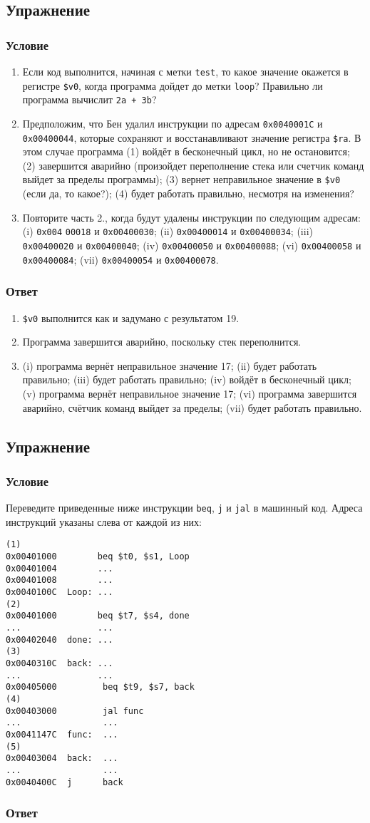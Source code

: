 \documentclass[12pt]{article}
\newenvironment{e}[1][dummy label]{
    \subsection{Упражнение}\label{#1}
    \subsubsection*{Условие}
    }{
    \subsubsection*{Ответ}
}
\begin{document}
\begin{e}
        \newpage

        \begin{enumerate}
            \item Если код выполнится, начиная с метки \texttt{test}, то какое значение окажется в регистре \texttt{\$v0}, когда программа дойдет до метки \texttt{loop}? Правильно ли программа вычислит \texttt{2а + 3b}?
            \item Предположим, что Бен удалил инструкции по адресам \texttt{0x0040001C} и \texttt{0x00400044}, которые сохраняют и восстанавливают значение регистра \texttt{\$ra}. В этом случае программа (1) войдёт в бесконечный цикл, но не остановится; (2) завершится аварийно (произойдет переполнение стека или счетчик команд выйдет за пределы программы); (3) вернет неправильное значение в \texttt{\$v0} (если да, то какое?); (4) будет работать правильно, несмотря на изменения?
            \item Повторите часть 2., когда будут удалены инструкции по следующим адресам: (i) \texttt{0x004} \texttt{00018} и \texttt{0x00400030}; (ii) \texttt{0x00400014} и \texttt{0x00400034}; (iii) \texttt{0x00400020} и \texttt{0x00400040}; (iv) \texttt{0x00400050} и \texttt{0x00400088}; (vi) \texttt{0x00400058} и \texttt{0x00400084}; (vii) \texttt{0x00400054} и \texttt{0x00400078}.
        \end{enumerate}
    \end{e}

    \begin{enumerate}
        \item \texttt{\$v0} выполнится как и задумано с результатом 19.
        \item Программа завершится аварийно, поскольку стек переполнится.
        \item (i) программа вернёт неправильное значение 17; (ii) будет работать правильно; (iii) будет работать правильно; (iv) войдёт в бесконечный цикл; (v) программа вернёт неправильное значение 17; (vi) программа завершится аварийно, счётчик команд выйдет за пределы; (vii) будет работать правильно.
    \end{enumerate}

    \newpage

    \begin{e}
        Переведите приведенные ниже инструкции \texttt{beq}, \texttt{j} и \texttt{jal} в машинный код. Адреса инструкций указаны слева от каждой из них:
        \begin{verbatim}
(1)
0x00401000        beq $t0, $s1, Loop
0x00401004        ...
0x00401008        ...
0x0040100C  Loop: ...
(2)
0x00401000        beq $t7, $s4, done
...               ...
0x00402040  done: ...
(3)
0x0040310C  back: ...
...               ...
0x00405000         beq $t9, $s7, back
(4)
0x00403000         jal func
...                ...
0x0041147C  func:  ...
(5)
0x00403004  back:  ...
...                ...
0x0040400C  j      back
        \end{verbatim}
    \end{e}
\end{document}
